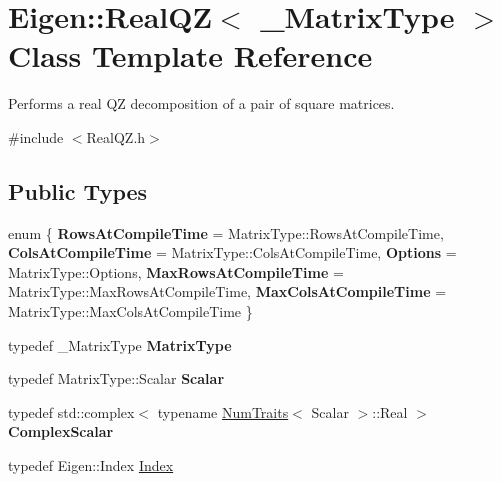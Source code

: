 \hypertarget{class_eigen_1_1_real_q_z}{}\section{Eigen\+::Real\+QZ$<$ \+\_\+\+Matrix\+Type $>$ Class Template Reference}
\label{class_eigen_1_1_real_q_z}


Performs a real QZ decomposition of a pair of square matrices.  




{\ttfamily \#include $<$Real\+Q\+Z.\+h$>$}

\subsection*{Public Types}
\begin{DoxyCompactItemize}
\item 
\mbox{\label{class_eigen_1_1_real_q_z_a71181dc6a94b9c1c66384eef40d60511}} 
enum \{ \newline
{\bfseries Rows\+At\+Compile\+Time} = Matrix\+Type\+::Rows\+At\+Compile\+Time, 
{\bfseries Cols\+At\+Compile\+Time} = Matrix\+Type\+::Cols\+At\+Compile\+Time, 
{\bfseries Options} = Matrix\+Type\+::Options, 
{\bfseries Max\+Rows\+At\+Compile\+Time} = Matrix\+Type\+::Max\+Rows\+At\+Compile\+Time, 
\newline
{\bfseries Max\+Cols\+At\+Compile\+Time} = Matrix\+Type\+::Max\+Cols\+At\+Compile\+Time
 \}
\item 
\mbox{\label{class_eigen_1_1_real_q_z_a78d0d6fe0e8a689523cf2da3f35abe1d}} 
typedef \+\_\+\+Matrix\+Type {\bfseries Matrix\+Type}
\item 
\mbox{\label{class_eigen_1_1_real_q_z_a06ae61ee5b81d0539fae804f91cd7acb}} 
typedef Matrix\+Type\+::\+Scalar {\bfseries Scalar}
\item 
\mbox{\label{class_eigen_1_1_real_q_z_a2788cf1defe2e6a0116f43efba689373}} 
typedef std\+::complex$<$ typename \mbox{\hyperlink{struct_eigen_1_1_num_traits}{Num\+Traits}}$<$ Scalar $>$\+::Real $>$ {\bfseries Complex\+Scalar}
\item 
typedef Eigen\+::\+Index \mbox{\hyperlink{class_eigen_1_1_real_q_z_a6201e534e901b5f4e66f72c176b534a3}{Index}}

\end{DoxyCompactItemize}
